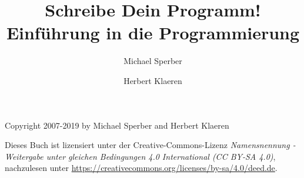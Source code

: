 \documentclass{tup}
\theoremstyle{plain}
\theoremstyle{plain}
\begin{document}
\setcounter{tocdepth}{1}
\begin{titlepage}
\title{Schreibe Dein Programm!\\{\large Einführung in die Programmierung}}
\author{Michael Sperber \and Herbert Klaeren}
\maketitle
Copyright \textcopyright{} 2007-2019 by Michael
  Sperber and Herbert Klaeren
  
  Dieses Buch ist lizensiert unter der Creative-Commons-Lizenz
  \textit{Namensnennung - Weitergabe unter gleichen Bedingungen 4.0 International (CC BY-SA 4.0)}, nachzulesen
  unter \url{https://creativecommons.org/licenses/by-sa/4.0/deed.de}.
\end{titlepage}

\thispagestyle{empty}

\tableofcontents

\setcounter{page}{1}










































\appendix



\nocite{Klaeren1983,HailperinKaiserKnight1999,FelleisenFindlerFlattKrishnamurthi2001,AbelsonSussmanSussman1996,Barendregt1990,KelseyClingerRees1998,Goos1996,Thiemann1994-gfp,Brooks1995,Meyer1997,HuthRyan2004,Hofstadter1979,Raymond1996,FriedmanWandHaynes2001,BauerWoessner1984,Hinze1991}




\printindex
\end{document}
